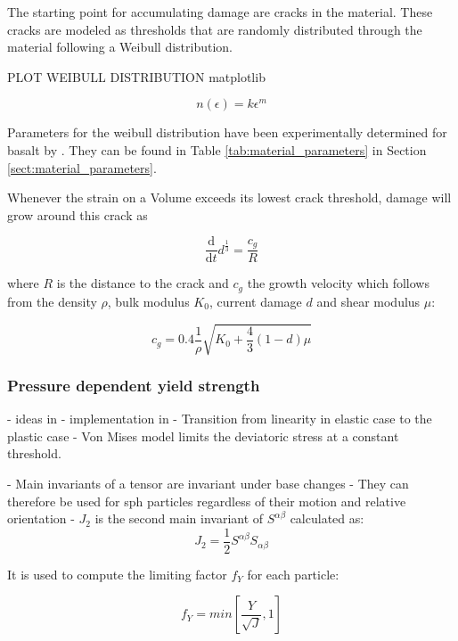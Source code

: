 The starting point for accumulating damage are cracks in the material. These cracks are modeled as thresholds that are randomly distributed through the material following a Weibull distribution.

PLOT WEIBULL DISTRIBUTION matplotlib

\begin{equation}
    n(\epsilon) = k\epsilon^m
\end{equation}

Parameters for the weibull distribution have been experimentally determined for basalt by \cite{Nakamura_2007}. They can be found in Table \ref{tab:material_parameters} in Section \ref{sect:material_parameters}.

Whenever the strain on a Volume exceeds its lowest crack threshold, damage will grow around this crack as

\begin{equation}
    \frac{\mathrm{d}}{\mathrm{d}t} d^{\frac{1}{3}} = \frac{c_g}{R}
\end{equation}

where $R$ is the distance to the crack and $c_g$ the growth velocity which follows from the density $\rho$, bulk modulus $K_0$, current damage $d$ and shear modulus $\mu$:

\begin{equation}
    c_g = 0.4\frac{1}{\rho}\sqrt{K_0 + \frac{4}{3}(1-d)\mu}
\end{equation}

\subsubsection{Pressure dependent yield strength}
- ideas in \cite{Collins_2004}
- implementation in \cite{Jutzi_2015}
- Transition from linearity in elastic case to the plastic case
- Von Mises model limits the deviatoric stress at a constant threshold.

- Main invariants of a tensor are invariant under base changes
- They can therefore be used for sph particles regardless of their motion and relative orientation
- $J_2$ is the second main invariant of $S^{\alpha \beta}$ calculated as:
\begin{equation}
    J_2 = \frac{1}{2}S^{\alpha \beta}S_{\alpha \beta}
\end{equation}

It is used to compute the limiting factor $f_Y$ for each particle:

\begin{equation}
    f_Y = min \left[\frac{Y}{\sqrt{J}}, 1 \right]
\end{equation}

